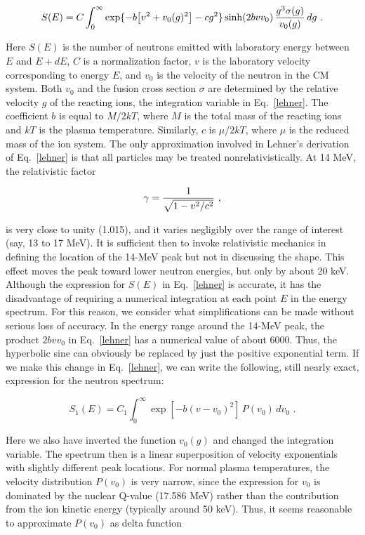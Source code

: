 \begin{equation}
  S(E)=C\int_0^\infty \exp\{-b\bigl[v^2+v_0(g)^2\bigr]-cg^2\}
  \sinh(2bvv_0)\,{{g^3\sigma(g)}\over{v_0(g)}}\,dg \,\,.
\label{lehner}
\end{equation}

\noindent
Here $S(E)$ is the number of neutrons emitted with laboratory
energy between $E$ and $E+dE$, $C$ is a normalization
factor, $v$ is the laboratory velocity corresponding to
energy $E$, and $v_0$ is the velocity of the neutron in
the CM system.  Both $v_0$ and the fusion cross section
$\sigma$ are determined by the relative velocity $g$ of
the reacting ions, the integration variable in Eq.~\ref{lehner}.
The coefficient $b$ is equal to $M/2kT$, where $M$ is the
total mass of the reacting ions and $kT$ is the plasma
temperature.  Similarly, $c$ is $\mu /2kT$, where $\mu$
is the reduced mass of the ion system.
The only approximation involved in Lehner's derivation
of Eq.~\ref{lehner} is that all particles may be treated
nonrelativistically.  At 14 MeV, the relativistic factor

\begin{equation}
  \gamma={{1}\over{\sqrt{1-v^2/c^2}}}\,\,,
\end{equation}

\noindent
is very close to unity (1.015), and it varies negligibly over
the range of interest (say, 13 to 17 MeV).  It is sufficient
then to invoke relativistic mechanics in defining the location
of the 14-MeV peak but not in discussing the shape.  This
effect  moves the peak toward lower neutron energies, but
only by about 20 keV.  Although the expression for $S(E)$
in Eq.~\ref{lehner} is accurate, it has the disadvantage of
requiring a numerical integration at each point $E$ in the
energy spectrum.  For this reason, we consider what
simplifications can be made without serious loss
of accuracy.  In the energy range around the 14-MeV peak, the
product $2bvv_0$ in Eq.~\ref{lehner} has a numerical value of
about 6000.  Thus, the hyperbolic sine can obviously be replaced
by just the positive exponential term.  If we make this change in
Eq.~\ref{lehner}, we can write the following, still nearly exact,
expression for the neutron spectrum:

\begin{equation}
  S_1(E)=C_1 \int_0^\infty \exp[-b(v-v_0)^2]\,P(v_0)\,dv_0 \,\,.
\label{intexp}
\end{equation}

\noindent
Here we also have inverted the function $v_0(g)$ and changed the
integration variable.  The spectrum then is a linear superposition
of velocity exponentials with slightly different peak locations.
For normal plasma temperatures, the velocity distribution
$P(v_0)$ is very narrow, since the expression for $v_0$ is
dominated by the nuclear Q-value (17.586 MeV) rather than the
contribution from the ion kinetic energy (typically around
50 keV).  Thus, it seems reasonable to approximate $P(v_0)$ as
delta function

